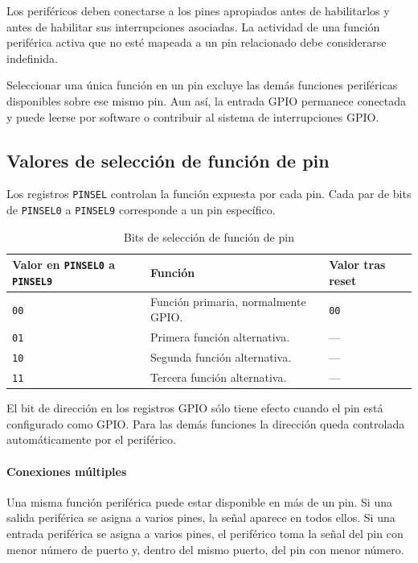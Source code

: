 Los periféricos deben conectarse a los pines apropiados antes de habilitarlos y antes de habilitar sus interrupciones asociadas. La actividad de una función periférica activa que no esté mapeada a un pin relacionado debe considerarse indefinida.

Seleccionar una única función en un pin excluye las demás funciones periféricas disponibles sobre ese mismo pin. Aun así, la entrada GPIO permanece conectada y puede leerse por software o contribuir al sistema de interrupciones GPIO.

\subsection{Valores de selección de función de pin}
Los registros \texttt{PINSEL} controlan la función expuesta por cada pin. Cada par de bits de \texttt{PINSEL0} a \texttt{PINSEL9} corresponde a un pin específico.

\begin{table}[H]
  \centering
  \small
  \renewcommand{\arraystretch}{1.15}
  \caption{Bits de selección de función de pin}
  \begin{tabularx}{0.9\textwidth}{|>{\raggedright\arraybackslash}p{}|>{\raggedright\arraybackslash}X|>{\raggedright\arraybackslash}p{}|}
    \hline
    \textbf{Valor en \texttt{PINSEL0} a \texttt{PINSEL9}} & \textbf{Función} & \textbf{Valor tras reset} \\
    \hline
    \texttt{00} & Función primaria, normalmente GPIO. & \texttt{00} \\
    \hline
    \texttt{01} & Primera función alternativa. & --- \\
    \hline
    \texttt{10} & Segunda función alternativa. & --- \\
    \hline
    \texttt{11} & Tercera función alternativa. & --- \\
    \hline
  \end{tabularx}
\end{table}

El bit de dirección en los registros GPIO sólo tiene efecto cuando el pin está configurado como GPIO. Para las demás funciones la dirección queda controlada automáticamente por el periférico.

\paragraph{Conexiones múltiples}
Una misma función periférica puede estar disponible en más de un pin. Si una salida periférica se asigna a varios pines, la señal aparece en todos ellos. Si una entrada periférica se asigna a varios pines, el periférico toma la señal del pin con menor número de puerto y, dentro del mismo puerto, del pin con menor número.

